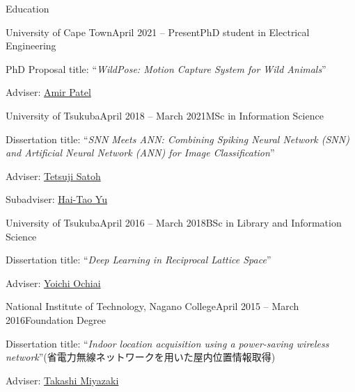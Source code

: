 \documentclass{resume} %
\begin{document}

\begin{rSection}{Education}

    \begin{rSubsection}{University of Cape Town}{April 2021 -- Present}{PhD student in Electrical Engineering}{}
    \item PhD Proposal title: ``{\it WildPose: Motion Capture System for Wild Animals}''
    \item Adviser: \href{https://scholar.google.co.za/citations?user=RxMigV4AAAAJ&view_op=list_works&sortby=pubdate}{Amir Patel}
    \end{rSubsection}

    \begin{rSubsection}{University of Tsukuba}{April 2018 -- March 2021}{MSc in Information Science}{}
    \item Dissertation title: ``{\it SNN Meets ANN: Combining Spiking Neural Network (SNN) and Artificial Neural Network (ANN) for Image Classification}''
    \item Adviser: \href{http://www.slis.tsukuba.ac.jp/~satoh.tetsuji.gf/index.html}{Tetsuji Satoh}
    \item Subadviser: \href{https://scholar.google.co.jp/citations?user=88b2NRsAAAAJ&hl=ja}{Hai-Tao Yu}
    \end{rSubsection}

    \begin{rSubsection}{University of Tsukuba}{April 2016 -- March 2018}{BSc in Library and Information Science}{}
    \item Dissertation title: ``{\it Deep Learning in Reciprocal Lattice Space}''
    \item Adviser: \href{https://scholar.google.co.jp/citations?user=obhH0jkAAAAJ&hl=en}{Yoichi Ochiai}
    \end{rSubsection}

    \begin{rSubsection}{National Institute of Technology, Nagano College}{April 2015 -- March 2016}{Foundation Degree}{}
    \item Dissertation title: ``{\it Indoor location acquisition using a power-saving wireless network}''(省電力無線ネットワークを用いた屋内位置情報取得)
    \item Adviser: \href{https://researchmap.jp/read0178034?lang=en}{Takashi Miyazaki}
    \end{rSubsection}

\end{rSection}
\end{document}
